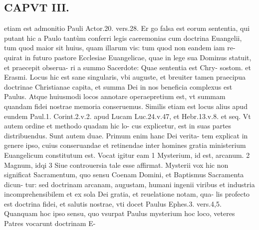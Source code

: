 \documentclass{article}
\begin{document}
\begin{pages}
\section*{CAPVT  III. }
\marginpar{[ p.175 ]}\pstart etiam est admonitio Pauli Actor.20. vers.28. Er go falsa est eorum sententia, qui putant hic a Paulo tantùm conferri legis caeremonias cum doctrina Euangelii, tum quod maior sit huius, quam illarum vis: tum quod non eandem iam re- quirat in futuro pastore Ecclesiae Euangelicae, quae in lege sua Dominus statuit, et praecepit obserua- ri a summo Sacerdote: Quae sententia est Chry- sostom. et Erasmi. Locus hic est sane singularis, vbi auguste, et breuiter tamen praecipua doctrinae Christianae capita, et summa Dei in nos beneficia complexus est Paulus. Atque huiusmodi locos annotare operaepretium est, vt summam quandam fidei nostrae memoria conseruemus. Similis etiam est locus alius apud eundem Paul.1. Corint.2.v.2. apud Lucam Luc.24.v.47, et Hebr.13.v.8. et seq. Vt autem ordine et methodo quadam hic lo- cus explicetur, est in suas partes distribuendus. Sunt autem duae. Primum enim hanc Dei verita- tem explicat in genere ipso, cuius conseruandae et retinendae inter homines gratia ministerium Euangelicum constitutum est. Vocat igitur eam 1 Mysterium, id est, arcanum. 2 Magnum, idqi 3 Siue controuersia tale esse affirmat. Mysterii vox hic non significat Sacramentum, quo sensu Coenam Domini, et Baptismus Sacramenta dicun- tur: sed doctrinam arcanam, augustam, humani ingenii viribus et industria incomprehensibilem et ex sola Dei gratia, et reuelatione notam, qua- lis profecto est doctrina fidei, et salutis nostrae, vti docet Paulus Ephes.3. vers.4,5. Quanquam hoc ipso sensu, quo vsurpat Paulus mysterium hoc loco, veteres Patres vocarunt doctrinam E-  \pend

\end{pages}
\end{document}
